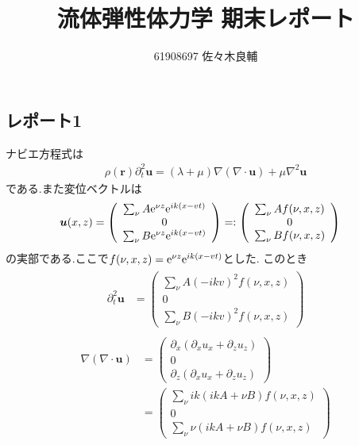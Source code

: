 \documentclass[uplatex,a4j,11pt,dvipdfmx]{jsarticle}
\begin{document}
\title{流体弾性体力学 期末レポート}
\author{61908697 佐々木良輔}
\date{}
\maketitle
\subsection*{レポート1}
ナビエ方程式は
\begin{align}
  \rho({\bm r})\partial_t^2{\bm u}=(\lambda+\mu)\nabla(\nabla\cdot{\bm u})+\mu\nabla^2{\bm u}
\end{align}
である.また変位ベクトルは
\begin{align}
  {\bm u}(x,z)=\left(
    \begin{array}{c}
      \sum_\nu A{\rm e}^{\nu z}{\rm e}^{ik(x-vt)}\\
      0\\
      \sum_\nu B{\rm e}^{\nu z}{\rm e}^{ik(x-vt)}
    \end{array}
  \right)
  &=:\left(
    \begin{array}{c}
      \sum_\nu Af(\nu,x,z)\\
      0\\
      \sum_\nu Bf(\nu,x,z)
    \end{array}
  \right)
\end{align}
の実部である.ここで$f(\nu,x,z)={\rm e}^{\nu z}{\rm e}^{ik(x-vt)}$とした.
このとき
\begin{align}
  \begin{split}
    \partial_t^2{\bm u}&=\left(
      \begin{array}{c}
        \sum_\nu A(-ikv)^2f(\nu,x,z)\\
        0\\
        \sum_\nu B(-ikv)^2f(\nu,x,z)
      \end{array}
    \right)
  \end{split}
\end{align}
\begin{align}
  \begin{split}
    \nabla(\nabla\cdot{\bm u})&=\left(
      \begin{array}{c}
        \partial_x(\partial_xu_x+\partial_zu_z)\\
        0\\
        \partial_z(\partial_xu_x+\partial_zu_z)
      \end{array}
    \right)\\
    &=\left(
      \begin{array}{c}
        \sum_\nu ik(ikA+\nu B)f(\nu,x,z)\\
        0\\
        \sum_\nu \nu(ikA+\nu B)f(\nu,x,z)
      \end{array}
    \right)
  \end{split}
\end{align}
\end{document}
